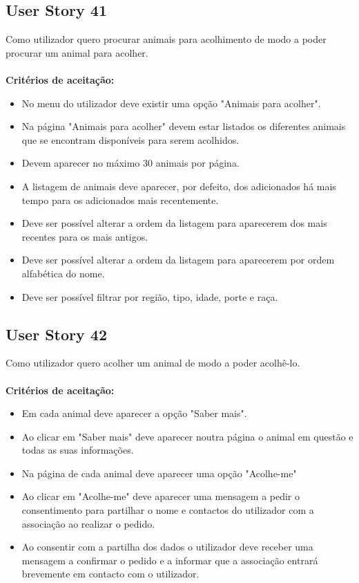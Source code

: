 \documentclass[a4paper,11pt]{article}
\begin{document}
\subsection*{User Story 41}
Como utilizador quero procurar animais para acolhimento de modo a poder procurar um animal para acolher.\\\\
\textbf{Critérios de aceitação:}
\begin{itemize}
    \item No menu do utilizador deve existir uma opção "Animais para acolher".
    \item Na página "Animais para acolher" devem estar listados os diferentes animais que se encontram disponíveis para serem acolhidos.
    \item Devem aparecer no máximo 30 animais por página.
    \item A listagem de animais deve aparecer, por defeito, dos adicionados há mais tempo para os adicionados mais recentemente.
    \item Deve ser possível alterar a ordem da listagem para aparecerem dos mais recentes para os mais antigos.
    \item Deve ser possível alterar a ordem da listagem para aparecerem por ordem alfabética do nome.
    \item Deve ser possível filtrar por região, tipo, idade, porte e raça.
\end{itemize}

\subsection*{User Story 42}
Como utilizador quero acolher um animal de modo a poder acolhê-lo.\\\\
\textbf{Critérios de aceitação:}
\begin{itemize}
    \item Em cada animal deve aparecer a opção "Saber mais".
    \item Ao clicar em "Saber mais" deve aparecer noutra página o animal em questão e todas as suas informações.
    \item Na página de cada animal deve aparecer uma opção "Acolhe-me"
    \item Ao clicar em "Acolhe-me" deve aparecer uma mensagem a pedir o consentimento para partilhar o nome e contactos do utilizador com a associação ao realizar o pedido.
    \item Ao consentir com a partilha dos dados o utilizador deve receber uma mensagem a confirmar o pedido e a informar que a associação entrará brevemente em contacto com o utilizador.
\end{itemize}
\end{document}
